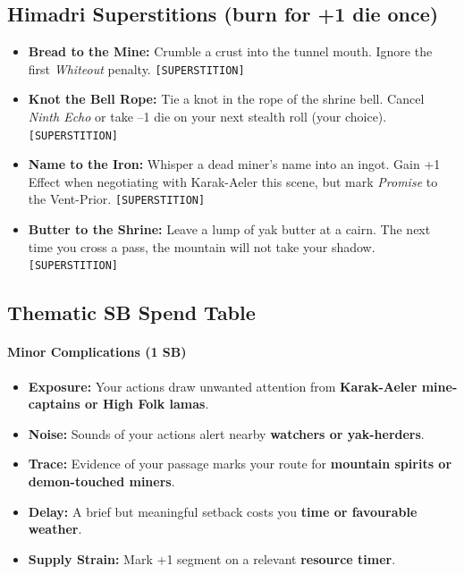 \subsection*{Himadri Superstitions (burn for +1 die once)}
\begin{itemize}
  \item \textbf{Bread to the Mine:} Crumble a crust into the tunnel mouth. Ignore the first \emph{Whiteout} penalty. \texttt{[SUPERSTITION]}
  \item \textbf{Knot the Bell Rope:} Tie a knot in the rope of the shrine bell. Cancel \emph{Ninth Echo} or take --1 die on your next stealth roll (your choice). \texttt{[SUPERSTITION]}
  \item \textbf{Name to the Iron:} Whisper a dead miner's name into an ingot. Gain +1 Effect when negotiating with Karak-Aeler this scene, but mark \emph{Promise} to the Vent-Prior. \texttt{[SUPERSTITION]}
  \item \textbf{Butter to the Shrine:} Leave a lump of yak butter at a cairn. The next time you cross a pass, the mountain will not take your shadow. \texttt{[SUPERSTITION]}
\end{itemize}

\subsection*{Thematic SB Spend Table}
\label{sec:himadri-sb}

\paragraph{Minor Complications (1 SB)}
\begin{itemize}
\item \textbf{Exposure:} Your actions draw unwanted attention from \textbf{Karak-Aeler mine-captains or High Folk lamas}.
\item \textbf{Noise:} Sounds of your actions alert nearby \textbf{watchers or yak-herders}.
\item \textbf{Trace:} Evidence of your passage marks your route for \textbf{mountain spirits or demon-touched miners}.
\item \textbf{Delay:} A brief but meaningful setback costs you \textbf{time or favourable weather}.
\item \textbf{Supply Strain:} Mark +1 segment on a relevant \textbf{resource timer}.
\end{itemize}

